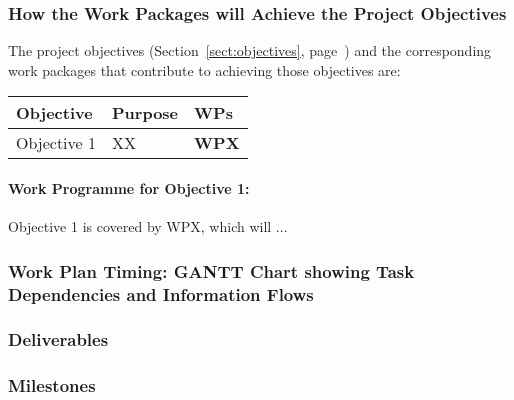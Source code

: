 \documentclass[noworkareas,deliverables,keys]{euproposal}                  %
\begin{document}
\begin{proposal}
\subsubsection*{How the Work Packages will Achieve the Project Objectives}
\label{sssec:how_the_work_packages_will_achieve}


The project objectives (Section~\ref{sect:objectives},
page~\pageref{sect:objectives}) and the corresponding work
packages that contribute to achieving those objectives are:

\begin{center}
\begin{tabular}{|l|l|l|}\hline
\textbf{Objective} & \textbf{Purpose} & \textbf{WPs} \\\hline \hline
Objective 1 & XX & \textbf{WPX} \\\hline
\end{tabular}
\end{center}

\paragraph*{Work Programme for Objective 1: }

Objective 1 is covered by WPX, which will ...

\subsubsection*{Work Plan Timing: GANTT Chart showing Task Dependencies and Information Flows}

\ganttchart[draft,xscale=.28] 
\newpage

\wpfigstyle{\footnotesize\def\tabcolsep{3.5pt}}
{\wpfig}

\newpage
\subsubsection*{Deliverables}\label{sec:deliverables}
\newpage
\subsubsection*{Milestones}\label{sec:milestones}




\end{proposal}
\end{document}
